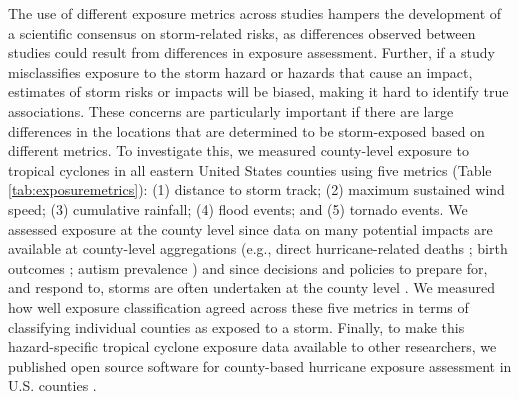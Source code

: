 \documentclass[fleqn,10pt,lineno]{olplainarticle}
\begin{document}
The use of different exposure metrics across studies hampers the development of
a scientific consensus on storm-related risks, as differences observed between
studies could result from differences in exposure assessment.  Further, if a
study misclassifies exposure to the storm hazard or hazards that cause an
impact, estimates of storm risks or impacts will be biased, making it hard to
identify true associations. These concerns are particularly important if there
are large differences in the locations that are determined to be storm-exposed
based on different metrics.  To investigate this, we measured county-level
exposure to tropical cyclones in all eastern United States counties using five
metrics (Table \ref{tab:exposuremetrics}): (1) distance to storm track; (2)
maximum sustained wind speed; (3) cumulative rainfall; (4) flood events; and
(5) tornado events.  We assessed exposure at the county level since data on
many potential impacts are available at county-level aggregations (e.g., direct
hurricane-related deaths \citep{czajkowski2011}; birth outcomes
\citep{grabich2015, grabich2016}; autism prevalence \citep{kinney2008}) and
since decisions and policies to prepare for, and respond to, storms are often
undertaken at the county level \citep{zandbergen2009, rappaport2000}. We
measured how well exposure classification agreed across these five metrics in
terms of classifying individual counties as exposed to a storm.  Finally, to
make this hazard-specific tropical cyclone exposure data available to other
researchers, we published open source software for county-based hurricane
exposure assessment in U.S. counties \citep{hurricaneexposure}.
\end{document}
